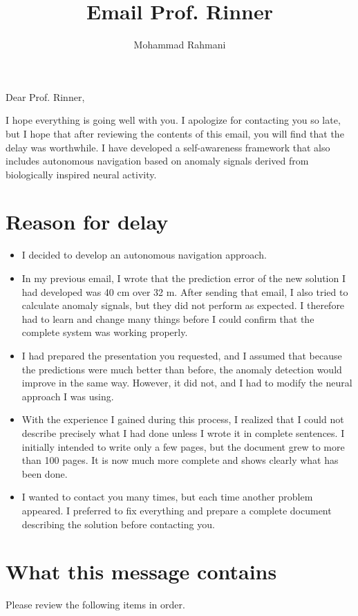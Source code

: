 \documentclass[a4paper]{article}
\title{Email Prof. Rinner}
\date{}
\author{Mohammad Rahmani}
\begin{document}
   \maketitle
   
   Dear Prof. Rinner,
   
   I hope everything is going well with you. I apologize for contacting you so late, but I hope that after reviewing the contents of this email, you will find that the delay was worthwhile. I have developed a self-awareness framework that also includes autonomous navigation based on anomaly signals derived from biologically inspired neural activity.
   
   \section{Reason for delay}
      \begin{itemize}
         \item I decided to develop an autonomous navigation approach.
         \item In my previous email, I wrote that the prediction error of the new solution I had developed was 40 cm over 32 m. After sending that email, I also tried to calculate anomaly signals, but they did not perform as expected. I therefore had to learn and change many things before I could confirm that the complete system was working properly.
         \item I had prepared the presentation you requested, and I assumed that because the predictions were much better than before, the anomaly detection would improve in the same way. However, it did not, and I had to modify the neural approach I was using.
         \item With the experience I gained during this process, I realized that I could not describe precisely what I had done unless I wrote it in complete sentences. I initially intended to write only a few pages, but the document grew to more than 100 pages. It is now much more complete and shows clearly what has been done.
         \item I wanted to contact you many times, but each time another problem appeared. I preferred to fix everything and prepare a complete document describing the solution before contacting you.
      \end{itemize}

   \section{What this message contains}
      Please review the following items in order.
\end{document}
